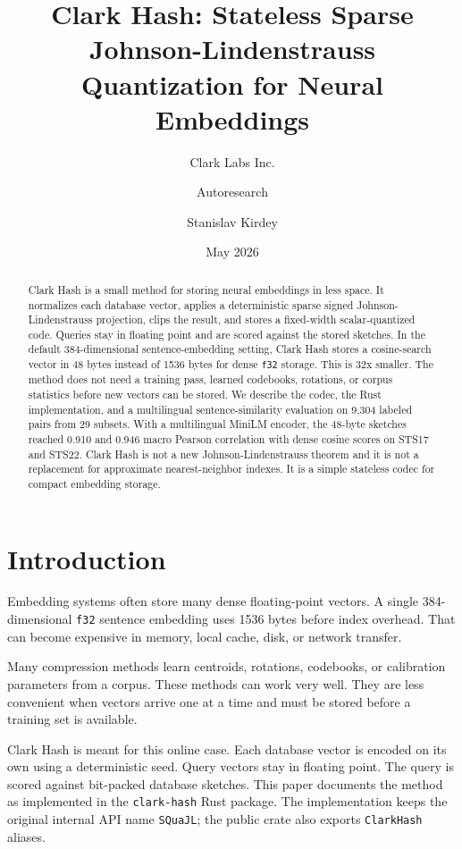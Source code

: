 \documentclass[11pt]{article}
\title{Clark Hash: Stateless Sparse Johnson-Lindenstrauss Quantization for Neural Embeddings}
\author{Clark Labs Inc. \and Autoresearch \and Stanislav Kirdey}
\date{May 2026}
\newcommand{\code}[1]{\texttt{#1}}
\begin{document}
\maketitle

\begin{abstract}
Clark Hash is a small method for storing neural embeddings in less space. It
normalizes each database vector, applies a deterministic sparse signed
Johnson-Lindenstrauss projection, clips the result, and stores a fixed-width
scalar-quantized code. Queries stay in floating point and are scored against the
stored sketches. In the default 384-dimensional sentence-embedding setting,
Clark Hash stores a cosine-search vector in 48 bytes instead of 1536 bytes for
dense \code{f32} storage. This is 32x smaller. The method does not need a
training pass, learned codebooks, rotations, or corpus statistics before new
vectors can be stored. We describe the codec, the Rust implementation, and a
multilingual sentence-similarity evaluation on 9,304 labeled pairs from 29
subsets. With a multilingual MiniLM encoder, the 48-byte sketches reached 0.910
and 0.946 macro Pearson correlation with dense cosine scores on STS17 and
STS22. Clark Hash is not a new Johnson-Lindenstrauss theorem and it is not a
replacement for approximate nearest-neighbor indexes. It is a simple stateless
codec for compact embedding storage.
\end{abstract}

\section{Introduction}

Embedding systems often store many dense floating-point vectors. A single
384-dimensional \code{f32} sentence embedding uses 1536 bytes before index
overhead. That can become expensive in memory, local cache, disk, or network
transfer.

Many compression methods learn centroids, rotations, codebooks, or calibration
parameters from a corpus. These methods can work very well. They are less
convenient when vectors arrive one at a time and must be stored before a
training set is available.

Clark Hash is meant for this online case. Each database vector is encoded on its
own using a deterministic seed. Query vectors stay in floating point. The query
is scored against bit-packed database sketches. This paper documents the method
as implemented in the \code{clark-hash} Rust package. The implementation keeps
the original internal API name \code{SQuaJL}; the public crate also exports
\code{ClarkHash} aliases.
\end{document}
